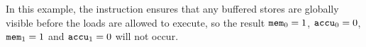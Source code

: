 \begin{table}[!hbt]
\noindent{}
\caption[Global Visibility]{Global Visibility \cite[Example 9]{ref:AMD}}
\label{tbl:litmus:amd:9}
\end{table}

\noindent
In this example, the  instruction ensures that any buffered stores are globally visible before the loads are allowed to execute, so the result $\texttt{mem}_0 = 1$, $\texttt{accu}_0 = 0$, $\texttt{mem}_1 = 1$ and $\texttt{accu}_1 = 0$ will not occur.
